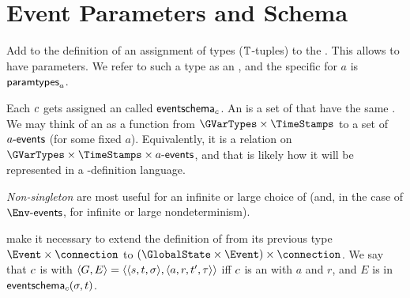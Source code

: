 \documentclass[12pt]{article}
\begin{document}
\section{Event Parameters and Schema} \label{eventparams}

Add to the definition of \Contract an assignment of types ($\mathbb{T}$-tuples) to the \Actions. This allows \Events to have parameters. We refer to such a type as an , and the specific \AParamsDomain for \Action $a$ is $\textsf{paramtypes}_{a}$.

Each  $c$ gets assigned an  called $\textsf{eventschema}_{c}$. An \EventSchema is a set of \Events that have the same \Action. We may think of an \EventSchema as a function from $\GVarTypes \times \TimeStamps$ to a set of $a\textsf{-events}$ (for some fixed $a$). Equivalently, it is a relation on $\GVarTypes \times \TimeStamps \times \depEvents{a}$, and that is likely how it will be represented in a \Contract-definition language. %

{\it Non-singleton} \EventSchema are most useful for an infinite or large choice of \Actions (and, in the case of $\depEvents{\Env}$, for infinite or large nondeterminism).

\EventSchema make it necessary to extend the definition of \compatible from its previous type $\Event \times \connection$ to $(\GlobalState \times \Event) \times \connection$. We say that \nameforaedge $c$ is  with  $\langle G,E\rangle = \langle\langle s,t,\sigma\rangle,\langle a,r,t',\tau\rangle\rangle$ iff
$c$ is an  with \Action $a$  and \Role $r$, and  $E$ is in $\textsf{eventschema}_{c}(\sigma, t)$.

\end{document}
